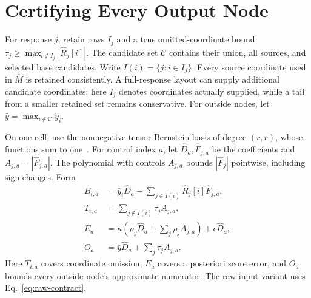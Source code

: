 \documentclass[conference]{IEEEtran}
\begin{document}
\section{Certifying Every Output Node}
\label{sec:certificate}
For response $j$, retain rows $I_j$ and a true omitted-coordinate bound $\tau_j\geq\max_{i\notin I_j}|\widehat R_j[i]|$. The candidate set $\mathcal C$ contains their union, all sources, and selected base candidates. Write $I(i)=\{j:i\in I_j\}$. Every source coordinate used in $\widehat M$ is retained consistently. A full-response layout can supply additional candidate coordinates: here $I_j$ denotes coordinates actually supplied, while a tail from a smaller retained set remains conservative. For outside nodes, let $\bar y=\max_{i\notin\mathcal C}\widehat y_i$.

On one cell, use the nonnegative tensor Bernstein basis of degree $(r,r)$, whose functions sum to one~\cite{sapo}. For control index $a$, let $\widehat D_a,\widehat F_{j,a}$ be the coefficients and $A_{j,a}=|\widehat F_{j,a}|$. The polynomial with controls $A_{j,a}$ bounds $|\widehat F_j|$ pointwise, including sign changes. Form
\begin{equation}
 \begin{aligned}
 B_{i,a}&=\widehat y_i\widehat D_a-
          \sum_{j\in I(i)}\widehat R_j[i]\widehat F_{j,a},\\
 T_{i,a}&=\sum_{j\notin I(i)}\tau_j A_{j,a},\\
 E_a&=\kappa\left(\rho_y\widehat D_a+\sum_j\rho_jA_{j,a}\right)
           +\epsilon\widehat D_a,\\
 O_a&=\bar y\widehat D_a+\sum_j\tau_jA_{j,a}.
 \end{aligned}
 \label{eq:controls}
\end{equation}
Here $T_{i,a}$ covers coordinate omission, $E_a$ covers a posteriori score error, and $O_a$ bounds every outside node's approximate numerator. The raw-input variant uses Eq.~\eqref{eq:raw-contract}.
\end{document}
